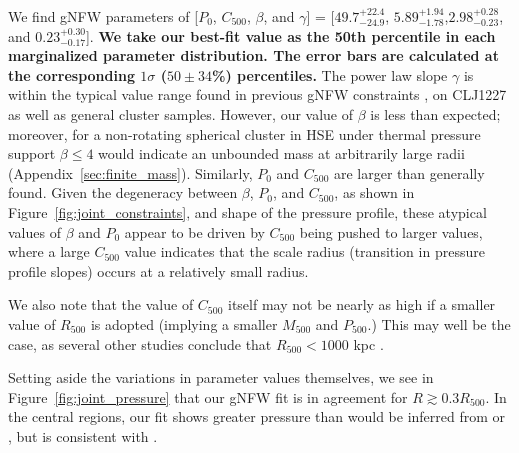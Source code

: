 \documentclass[twocolumn,traditabstract]{aa}
\begin{document}
We find gNFW parameters of [$P_0$, $C_{500}$, $\beta$, and $\gamma$] =
[$49.7_{-24.9}^{+22.4}$, $5.89_{-1.78}^{+1.94}$,$2.98_{-0.23}^{+0.28}$, and $0.23_{-0.17}^{+0.30}$].
\textbf{We take our best-fit value as the 50th percentile in each marginalized parameter distribution.
The error bars are calculated at the corresponding $1\sigma$ ($50 \pm 34$\%) percentiles.}
The power law slope $\gamma$ is within the typical value range found in previous gNFW constraints
\citep[e.g]{nagai2007,arnaud2010,sayers2013},
on CLJ1227 as well as general cluster samples. However, our value of $\beta$ is less than expected;
moreover, for a non-rotating spherical cluster in HSE under thermal pressure support $\beta \le 4$ would
indicate an unbounded mass at arbitrarily large radii (Appendix~\ref{sec:finite_mass}).
Similarly, $P_0$ and $C_{500}$ are larger than generally found.
Given the degeneracy between $\beta$, $P_0$, and $C_{500}$, as shown in Figure~\ref{fig:joint_constraints},
and shape of the pressure profile, these atypical
values of $\beta$ and  $P_0$ appear to be driven by $C_{500}$ being pushed to larger values, where a large $C_{500}$
value indicates that the scale radius (transition in pressure profile slopes) occurs at a relatively small radius.

We also note that the value of $C_{500}$ itself may not be nearly as high if a smaller value of $R_{500}$
is adopted (implying a smaller $M_{500}$ and $P_{500}$.) This may well be the case, as several other
studies conclude that $R_{500} < 1000$ kpc \citep[e.g][]{rumsey2016,mroczkowski2009}.

Setting aside the variations in parameter values themselves, we see in Figure~\ref{fig:joint_pressure} that our
gNFW fit is in agreement for $R \gtrsim 0.3 R_{500}$. In the central regions, our fit shows greater pressure than
would be inferred from  or \citet{planck2013a}, but is consistent with \citet{romero2017}.
\end{document}
